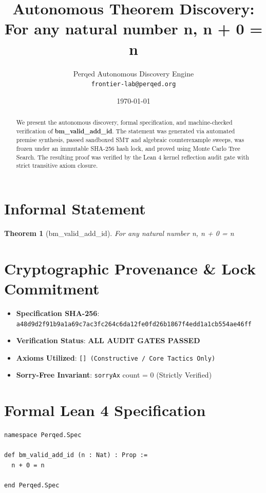 \documentclass[11pt,a4paper]{article}
\title{\textbf{Autonomous Theorem Discovery: For any natural number n, n + 0 = n}}
\author{Perqed Autonomous Discovery Engine \\ \texttt{frontier-lab@perqed.org}}
\date{\today}
\newtheorem{theorem}{Theorem}
\begin{document}
\maketitle

\begin{abstract}
We present the autonomous discovery, formal specification, and machine-checked verification of \textbf{bm_valid_add_id}. The statement was generated via automated premise synthesis, passed sandboxed SMT and algebraic counterexample sweeps, was frozen under an immutable SHA-256 hash lock, and proved using Monte Carlo Tree Search. The resulting proof was verified by the Lean 4 kernel reflection audit gate with strict transitive axiom closure.
\end{abstract}

\section{Informal Statement}
\begin{theorem}[bm_valid_add_id]
For any natural number n, n + 0 = n
\end{theorem}

\section{Cryptographic Provenance \& Lock Commitment}
\begin{itemize}
  \item \textbf{Specification SHA-256}: \texttt{a48d9d2f91b9a1a69c7ac3fc264c6da12fe0fd26b1867f4edd1a1cb554ae46ff}
  \item \textbf{Verification Status}: \textbf{ALL AUDIT GATES PASSED}
  \item \textbf{Axioms Utilized}: \texttt{[] (Constructive / Core Tactics Only)}
  \item \textbf{Sorry-Free Invariant}: \texttt{sorryAx} count = 0 (Strictly Verified)
\end{itemize}

\section{Formal Lean 4 Specification}
\begin{lstlisting}[language=Lean]
namespace Perqed.Spec

def bm_valid_add_id (n : Nat) : Prop :=
  n + 0 = n

end Perqed.Spec
\end{lstlisting}
\end{document}
